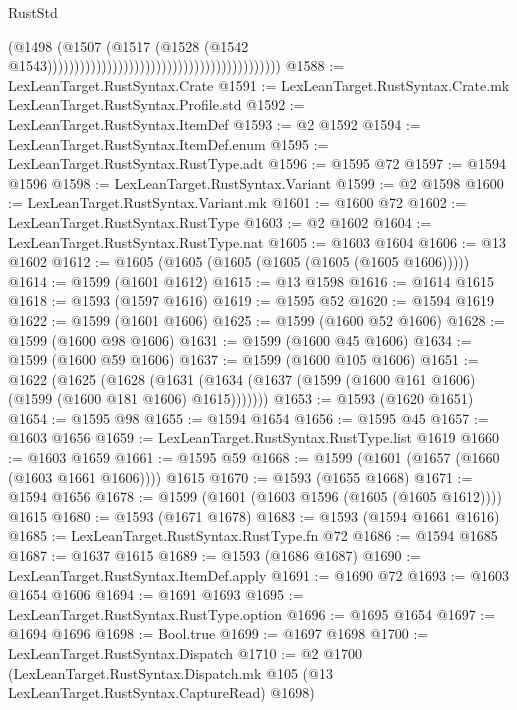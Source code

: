 \begin{lexlean}{RustStd}
\begin{coremodule}
                                                                                (@1498
                                                                                  (@1507
                                                                                    (@1517
                                                                                      (@1528
                                                                                        (@1542
                                                                                          @1543)))))))))))))))))))))))))))))))))))))))))))
@1588 := LexLeanTarget.RustSyntax.Crate
@1591 := LexLeanTarget.RustSyntax.Crate.mk LexLeanTarget.RustSyntax.Profile.std
@1592 := LexLeanTarget.RustSyntax.ItemDef
@1593 := @2 @1592
@1594 := LexLeanTarget.RustSyntax.ItemDef.enum
@1595 := LexLeanTarget.RustSyntax.RustType.adt
@1596 := @1595 @72
@1597 := @1594 @1596
@1598 := LexLeanTarget.RustSyntax.Variant
@1599 := @2 @1598
@1600 := LexLeanTarget.RustSyntax.Variant.mk
@1601 := @1600 @72
@1602 := LexLeanTarget.RustSyntax.RustType
@1603 := @2 @1602
@1604 := LexLeanTarget.RustSyntax.RustType.nat
@1605 := @1603 @1604
@1606 := @13 @1602
@1612 := @1605 (@1605 (@1605 (@1605 (@1605 (@1605 @1606)))))
@1614 := @1599 (@1601 @1612)
@1615 := @13 @1598
@1616 := @1614 @1615
@1618 := @1593 (@1597 @1616)
@1619 := @1595 @52
@1620 := @1594 @1619
@1622 := @1599 (@1601 @1606)
@1625 := @1599 (@1600 @52 @1606)
@1628 := @1599 (@1600 @98 @1606)
@1631 := @1599 (@1600 @45 @1606)
@1634 := @1599 (@1600 @59 @1606)
@1637 := @1599 (@1600 @105 @1606)
@1651 := @1622
    (@1625
      (@1628 (@1631 (@1634 (@1637 (@1599 (@1600 @161 @1606) (@1599 (@1600 @181 @1606) @1615)))))))
@1653 := @1593 (@1620 @1651)
@1654 := @1595 @98
@1655 := @1594 @1654
@1656 := @1595 @45
@1657 := @1603 @1656
@1659 := LexLeanTarget.RustSyntax.RustType.list @1619
@1660 := @1603 @1659
@1661 := @1595 @59
@1668 := @1599 (@1601 (@1657 (@1660 (@1603 @1661 @1606)))) @1615
@1670 := @1593 (@1655 @1668)
@1671 := @1594 @1656
@1678 := @1599 (@1601 (@1603 @1596 (@1605 (@1605 @1612)))) @1615
@1680 := @1593 (@1671 @1678)
@1683 := @1593 (@1594 @1661 @1616)
@1685 := LexLeanTarget.RustSyntax.RustType.fn @72
@1686 := @1594 @1685
@1687 := @1637 @1615
@1689 := @1593 (@1686 @1687)
@1690 := LexLeanTarget.RustSyntax.ItemDef.apply
@1691 := @1690 @72
@1693 := @1603 @1654 @1606
@1694 := @1691 @1693
@1695 := LexLeanTarget.RustSyntax.RustType.option
@1696 := @1695 @1654
@1697 := @1694 @1696
@1698 := Bool.true
@1699 := @1697 @1698
@1700 := LexLeanTarget.RustSyntax.Dispatch
@1710 := @2
    @1700
    (LexLeanTarget.RustSyntax.Dispatch.mk @105 (@13 LexLeanTarget.RustSyntax.CaptureRead) @1698)

\end{coremodule}
\end{lexlean}
